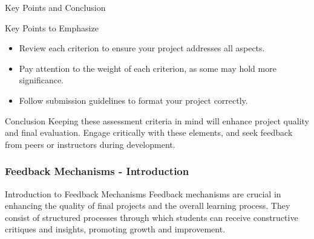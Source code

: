 \documentclass[aspectratio=169]{beamer}
\begin{document}
\begin{frame}[fragile]{Key Points and Conclusion}
    \begin{block}{Key Points to Emphasize}
        \begin{itemize}
            \item Review each criterion to ensure your project addresses all aspects.
            \item Pay attention to the weight of each criterion, as some may hold more significance.
            \item Follow submission guidelines to format your project correctly.
        \end{itemize}
    \end{block}
    
    \begin{block}{Conclusion}
        Keeping these assessment criteria in mind will enhance project quality and final evaluation. Engage critically with these elements, and seek feedback from peers or instructors during development.
    \end{block}
\end{frame}

\begin{frame}[fragile]
    \frametitle{Feedback Mechanisms - Introduction}
    \begin{block}{Introduction to Feedback Mechanisms}
        Feedback mechanisms are crucial in enhancing the quality of final projects and the overall learning process. They consist of structured processes through which students can receive constructive critiques and insights, promoting growth and improvement.
    \end{block}
\end{frame}
\end{document}
